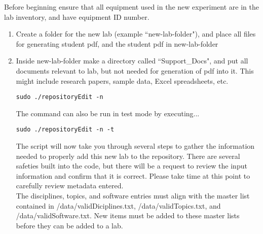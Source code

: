\documentclass[justified]{book}
\begin{document}
Before beginning ensure that all equipment used in the new experiment are in the lab inventory, and have equipment ID number. 

\begin{enumerate}
\item Create a folder for the new lab (example ``new-lab-folder"), and place all files for generating student pdf, and the student pdf in new-lab-folder
\item Inside new-lab-folder make a directory called ``Support\_Docs", and put all documents relevant to lab, but not needed for generation of pdf into it. This might include research papers, sample data, Excel spreadsheets, etc.



\begin{lstlisting}[backgroundcolor = \color{light-gray}]
sudo ./repositoryEdit -n
\end{lstlisting}

The command can also be run in test mode by executing...

\begin{lstlisting}[backgroundcolor = \color{light-gray}]
sudo ./repositoryEdit -n -t
\end{lstlisting}

The script will now take you through several steps to gather the information needed to properly add this new lab to the repository. There are several safeties built into the code, but there will be a request to review the input information and confirm that it is correct. Please take time at this point to carefully review metadata entered.\\

The disciplines, topics, and software entries must align with the master list contained in /data/validDiciplines.txt, /data/validTopics.txt, and /data/validSoftware.txt. New items must be added to these master lists before they can be added to a lab.


\end{enumerate}
\end{document}
